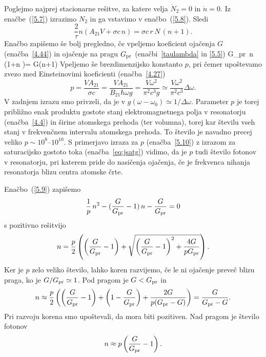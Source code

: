 Poglejmo najprej stacionarne rešitve, za katere velja $\dot{N}_{2}=0$ in 
$\dot{n}=0$. Iz enačbe~(\ref{5.7}) izrazimo $N_{2}$ in ga vstavimo v enačbo~(\ref{5.8}).
Sledi 
\begin{equation}
\frac{2}{\tau }n\left(A_{21}V+\sigma c\,n\right)=
\sigma c\, r\,N\,(n+1).
\label{5.9}
\end{equation}
Enačbo zapišemo še bolj pregledno, če vpeljemo koeficient ojačenja $G$ (enačba~\ref{4.44})
in ojačenje na pragu $G_{\rm pr}$ (enačbi~\ref{taulambda} in \ref{5.5})
\beq
G_{\rm pr}\, n\, \left(1+n \right)= G(n+1)
\eeq
Vpeljemo še brezdimenzijsko konstanto $p$, pri čemer upoštevamo zvezo
med Einsteinovimi koeficienti (enačba~\ref{4.27})
\begin{equation}
p=\frac{VA_{21}}{\sigma c} = 
\frac{VA_{21}}{B_{21}\hbar \omega g}=\frac{V\omega ^{2}}{\pi
^{2}c^{3}g}\simeq 
\frac{V\omega ^{2}}{\pi ^{2}c^{3}}\Delta \omega.  
\label{5.10}
\end{equation}
V zadnjem izrazu smo privzeli, da je v $g(\omega-\omega_0)\simeq
1/\Delta \omega $. Parameter $p$ je torej približno enak produktu 
gostote stanj elektromagnetnega polja v resonatorju (enačba~\ref{4.4}) 
in širine atomskega prehoda (ter volumna), torej kar številu vseh stanj 
v frekvenčnem intervalu atomskega prehoda. To število je navadno precej 
veliko $p \sim 10^{8}$--$10^{10}$. S primerjavo izraza za $p$ 
(enačba~\ref{5.10}) z izrazom za saturacijsko gostoto toka (enačba~\ref{eq:jsatg})
vidimo, da je $p$ tudi število fotonov v resonatorju, pri katerem pride 
do nasičenja ojačenja, če je frekvenca nihanja resonatorja blizu 
centra atomske črte. 

Enačbo~(\ref{5.9}) zapišemo 
\begin{equation}
\frac{1}{p}\,n^{2}-(\frac{G}{G_{\rm pr}}-1)\,n-\frac{G}{G_{\rm pr}}=0
\label{5.11}
\end{equation}
s pozitivno rešitvijo 
\begin{equation}
n=\frac{p}{2}\left( \left(\frac{G}{G_{\rm pr}}-1\right)+\sqrt{\left(\frac{G}{G_{\rm pr}}
-1\right)^{2}+ \frac{4G}{pG_{\rm pr}}}\right).
\label{5.12}
\end{equation}
Ker je $p$ zelo veliko število, lahko koren razvijemo, če le ni ojačenje
preveč blizu praga, ko je $G/G_{\rm pr}\simeq 1$. Pod pragom je $G<G_{\rm pr}$ 
in 
\begin{equation}
n\approx \frac{p}{2}\left( \left(\frac{G}{G_{\rm pr}}-1\right)+\left(1
-\frac{G}{G_{\rm pr}}\right)+\frac{2G}{p(G_{\rm pr}-G)}\right) =\frac{G}{G_{\rm pr}-G}.
\label{5.13}
\end{equation}
Pri razvoju korena smo upoštevali, da mora biti pozitiven. Nad pragom je
število fotonov 
\begin{equation}
n\approx p\left(\frac{G}{G_{\rm pr}}-1\right).
\label{5.14}
\end{equation}

